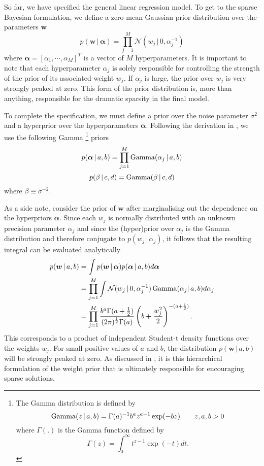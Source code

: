 So far, we have specified the general linear regression model.
To get to the sparse Bayesian formulation, we define a zero-mean Gaussian prior distribution over the parameters $\bm w$
\begin{equation}
\label{eqn:prior_w}
  p(\bm w\,|\,\bm \alpha) = \prod_{j=1}^M \mathcal{N}\left(w_j\,|\,0,\alpha_j^{-1}\right)
\end{equation}
where $\bm \alpha = \left[\alpha_1,\cdots,\alpha_M\right]^T$ is a vector of $M$ hyperparameters.
It is important to note that each hyperparameter $\alpha_j$ is solely responsible for controlling the strength of the prior of its associated weight $w_j$.
If $\alpha_j$ is large, the prior over $w_j$ is very strongly peaked at zero.
This form of the prior distribution is, more than anything, responsible for the dramatic sparsity in the final model.

To complete the specification, we must define a prior over the noise parameter $\sigma^2$ and a hyperprior over the hyperparameters $\bm \alpha$.
Following the derivation in \cite{tipping2001}, we use the following Gamma
\footnote{
The Gamma distribution is defined by   
\[
\operatorname*{Gamma}(z\,|\,a,b) = \Gamma(a)^{-1} b^a z^{a-1} \exp(-bz)  \qquad z,a,b > 0
\]
where $\Gamma(.)$ is the Gamma function defined by 
\[
\Gamma(z) = \int_0^\infty t^{z-1} \exp(-t) dt.
\]
} priors
\begin{equation}
\label{eqn:prior_alpha}
  p(\bm\alpha\,|\,a,b) = \prod_{j=1}^M \operatorname*{Gamma}(\alpha_j\,|\,a,b)
\end{equation}
\begin{equation}
\label{eqn:prior_beta}
  p(\beta\,|\,c,d) = \operatorname*{Gamma}(\beta\,|\,c,d)
\end{equation}
where $\beta \equiv \sigma^{-2}$.

As a side note, consider the prior of $\bm w$ after marginalising out the dependence on the hyperpriors $\bm\alpha$.
Since each $w_j$ is normally distributed with an unknown precision parameter $\alpha_j$ and since the (hyper)prior over $\alpha_j$ is the Gamma distribution and therefore conjugate to $p(w_j\,|\,\alpha_j)$, it follows that the resulting integral can be evaluated analytically
\begin{equation*}
  \begin{split}
    p(\bm w\,|\,a,b) &= \int p(\bm w\,|\,\bm\alpha) p(\bm\alpha\,|\,a,b)d\bm\alpha\\
    &= \prod_{j=1}^M \int \mathcal{N}(w_j\,|\,0,\alpha_j^{-1}) \operatorname*{Gamma}(\alpha_j|\,a,b)d\alpha_j\\
    &= \prod_{j=1}^M \frac{b^a\Gamma(a+\frac{1}{2})}{(2\pi)^{\frac{1}{2}}\Gamma(a)}\left(b+\frac{w_j^2}{2}\right)^{-(a+\frac{1}{2})}.
\end{split}
\end{equation*}
This corresponds to a product of independent Student-t density functions over the weights $w_j$.
For small positive values of $a$ and $b$, the distribution $p(\bm w\,|\,a,b)$ will be strongly peaked at zero.
As discussed in \cite{tipping2001}, it is this hierarchical formulation of the weight prior that is ultimately responsible for encouraging sparse solutions.


